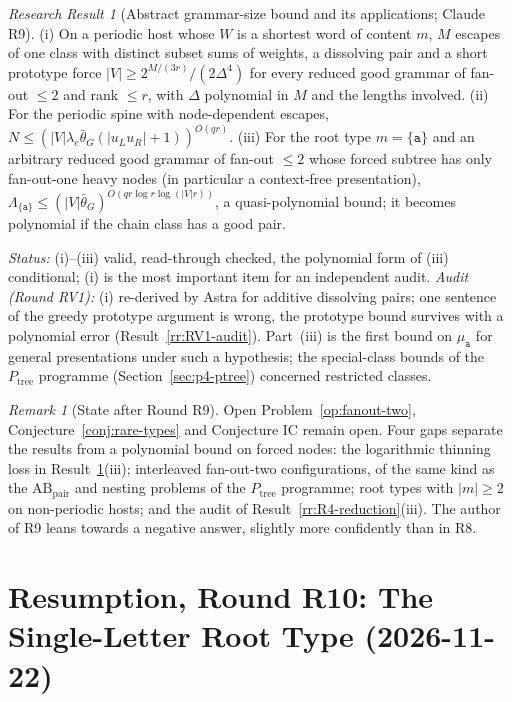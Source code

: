 \documentclass[11pt]{article}
\numberwithin{equation}{section}
\theoremstyle{plain}
\theoremstyle{definition}
\theoremstyle{remark}
\newtheorem{remark}[theorem]{Remark}
\newtheorem{rresult}[theorem]{Research Result}
\theoremstyle{plain}
\begin{document}
\begin{rresult}[Abstract grammar-size bound and its applications; Claude R9]
\label{rr:R9-bounds}
(i) On a periodic host whose $W$ is a shortest word of content $m$, $M$ escapes of one class
with distinct subset sums of weights, a dissolving pair and a short prototype force
$|V|\ge2^{M/(3r)}/(2\Delta^4)$ for every reduced good grammar of fan-out $\le2$ and rank
$\le r$, with $\Delta$ polynomial in $M$ and the lengths involved.  (ii) For the periodic spine
with node-dependent escapes, $N\le(|V|\lambda_e\bar\theta_G(|u_Lu_R|+1))^{O(qr)}$.  (iii) For
the root type $m=\{\mathtt a\}$ and an arbitrary reduced good grammar of fan-out $\le2$ whose
forced subtree has only fan-out-one heavy nodes (in particular a context-free presentation),
$\Lambda_{\{\mathtt a\}}\le(|V|\bar\theta_G)^{O(qr\log r\log(|V|r))}$, a quasi-polynomial bound;
it becomes polynomial if the chain class has a good pair.
\end{rresult}
\noindent\emph{Status:} (i)--(iii) valid, read-through checked, the polynomial form of (iii)
conditional; (i) is the most important item for an independent audit.  \emph{Audit (Round
RV1):} (i) re-derived by Astra for additive dissolving pairs; one sentence of the greedy prototype
argument is wrong, the prototype bound survives with a polynomial error
(Result~\ref{rr:RV1-audit}).  Part~(iii) is the first
bound on $\mu_{\mathtt a}$ for general presentations under such a hypothesis; the special-class
bounds of the $P_{\mathrm{tree}}$ programme (Section~\ref{sec:p4-ptree}) concerned restricted
classes.

\begin{remark}[State after Round R9]
\label{rem:R9-state}
Open Problem~\ref{op:fanout-two}, Conjecture~\ref{conj:rare-types} and Conjecture IC remain
open.  Four gaps separate the results from a polynomial bound on forced nodes:
the logarithmic thinning loss in Result~\ref{rr:R9-bounds}(iii); interleaved fan-out-two
configurations, of the same kind as the $\mathrm{AB}_{\mathrm{pair}}$ and nesting problems of the
$P_{\mathrm{tree}}$ programme; root types with $|m|\ge2$ on non-periodic hosts; and the audit of
Result~\ref{rr:R4-reduction}(iii).  The author of R9 leans towards a negative answer, slightly
more confidently than in R8.
\end{remark}

\section{Resumption, Round R10: The Single-Letter Root Type (2026-11-22)}
\label{sec:p4-resume-R10}
\end{document}

